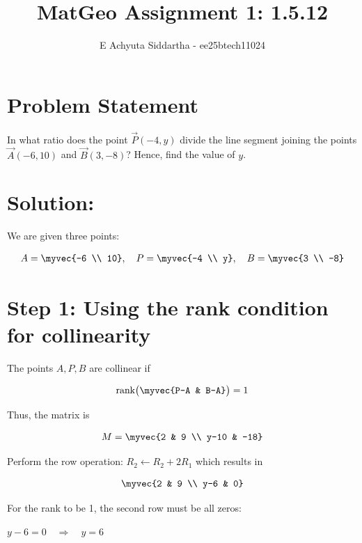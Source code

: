 \documentclass[14pt, a4paper]{extarticle}
\title{MatGeo Assignment 1: 1.5.12}
\author{E Achyuta Siddartha - ee25btech11024}
\begin{document}
\maketitle

\section*{Problem Statement}
In what ratio does the point $\vec{P}(-4, y)$ divide the line segment joining the points $\vec{A}(-6, 10)$ and $\vec{B}(3, -8)$? Hence, find the value of $y$.

\hr

\noindent
\section*{Solution:}

\noindent
We are given three points:

\begin{align}
A = \myvec{-6 \\ 10}, \quad 
P = \myvec{-4 \\ y}, \quad 
B = \myvec{3 \\ -8}
\end{align}

\section*{Step 1: Using the rank condition for collinearity}

The points \(A, P, B\) are collinear if

\begin{align}
\text{rank}\big(\myvec{P-A & B-A}\big) = 1
\end{align}

Thus, the matrix is

\begin{align}
M = \myvec{2 & 9 \\ y-10 & -18}
\end{align}

Perform the row operation: $R_2 \leftarrow R_2 + 2R_1$  which results in

\begin{align}
\myvec{2 & 9 \\ y-6 & 0}
\end{align}

For the rank to be 1, the second row must be all zeros:

$
y - 6 = 0 \quad \Rightarrow \quad y = 6
$
\end{document}
